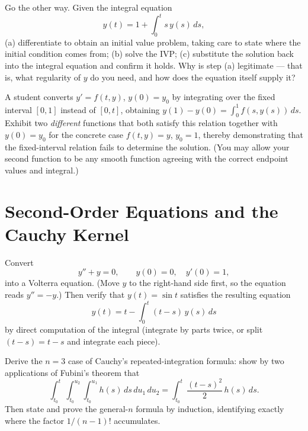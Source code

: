 \documentclass{essay}
\begin{document}
\begin{exercise}\label{ex:backward}
  Go the other way. Given the integral equation
  \[
    y(t) = 1 + \int_0^t s\,y(s)\,ds,
  \]
  (a) differentiate to obtain an initial value problem, taking care to state where the initial condition comes from; (b) solve the IVP; (c) substitute the solution back into the integral equation and confirm it holds. Why is step (a) legitimate --- that is, what regularity of $y$ do you need, and how does the equation itself supply it?
\end{exercise}

\begin{exercise}\label{ex:wrongway}
  A student converts $y' = f(t,y)$, $y(0) = y_0$ by integrating over the fixed interval $[0, 1]$ instead of $[0, t]$, obtaining $y(1) - y(0) = \int_0^1 f(s, y(s))\,ds$. Exhibit two \emph{different} functions that both satisfy this relation together with $y(0) = y_0$ for the concrete case $f(t,y) = y$, $y_0 = 1$, thereby demonstrating that the fixed-interval relation fails to determine the solution. (You may allow your second function to be any smooth function agreeing with the correct endpoint values and integral.)
\end{exercise}

\section{Second-Order Equations and the Cauchy Kernel}

\begin{exercise}\label{ex:sine}
  Convert
  \[
    y'' + y = 0, \qquad y(0) = 0, \quad y'(0) = 1,
  \]
  into a Volterra equation. (Move $y$ to the right-hand side first, so the equation reads $y'' = -y$.) Then verify that $y(t) = \sin t$ satisfies the resulting equation
  \[
    y(t) = t - \int_0^t (t - s)\, y(s)\, ds
  \]
  by direct computation of the integral (integrate by parts twice, or split $(t-s) = t - s$ and integrate each piece).
\end{exercise}

\begin{exercise}\label{ex:cauchy3}
  Derive the $n = 3$ case of Cauchy's repeated-integration formula: show by two applications of Fubini's theorem that
  \[
    \int_{t_0}^{t}\!\!\int_{t_0}^{u_2}\!\!\int_{t_0}^{u_1} h(s)\, ds\, du_1\, du_2
    = \int_{t_0}^{t} \frac{(t - s)^2}{2}\, h(s)\, ds.
  \]
  Then state and prove the general-$n$ formula by induction, identifying exactly where the factor $1/(n-1)!$ accumulates.
\end{exercise}
\end{document}
